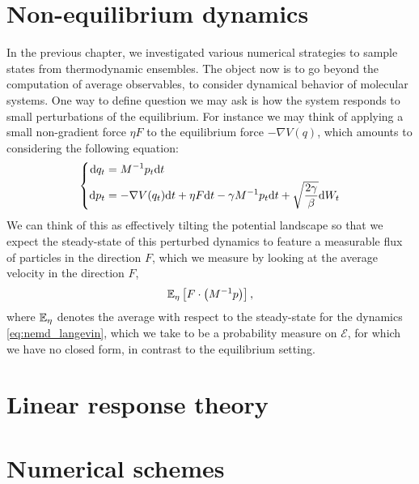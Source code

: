 \section{Non-equilibrium dynamics}
In the previous chapter, we investigated various numerical strategies to sample states from thermodynamic ensembles.
The object now is to go beyond the computation of average observables, to consider dynamical behavior of molecular systems.
One way to define question we may ask is how the system responds to small perturbations of the equilibrium.
For instance we may think of applying a small non-gradient force $\eta F$ to the equilibrium force $-\nabla V(q)$, which amounts to considering the following equation:
\begin{equation}
    \label{eq:nemd_langevin}
    \left\{\begin{aligned}
        \mathrm{d} q_t &= M^{-1}p_t\mathrm{d} t\\
        \mathrm{d} p_t &= -\nabla V(q_t)\mathrm{d} t +\eta F\mathrm{d} t -\gamma M^{-1}p_t\mathrm{d} t +\sqrt{\frac{2\gamma}{\beta}}\mathrm{d} W_t
    \end{aligned}\right.
\end{equation}
We can think of this as effectively tilting the potential landscape so that we expect the steady-state of this perturbed dynamics to feature a measurable flux of particles in the direction $F$,
which we measure by looking at the average velocity in the direction $F$,
\begin{equation}
    \label{eq:mobility}
    \mathbb{E}_\eta\left[F\cdot \left(M^{-1}p\right)\right],
\end{equation}
where $\mathbb{E}_\eta$ denotes the average with respect to the steady-state for the dynamics \eqref{eq:nemd_langevin}, which we take to be a probability measure on $\mathcal E$,
 for which we have no closed form, in contrast to the equilibrium setting.
\section{Linear response theory}
\section{Numerical schemes}